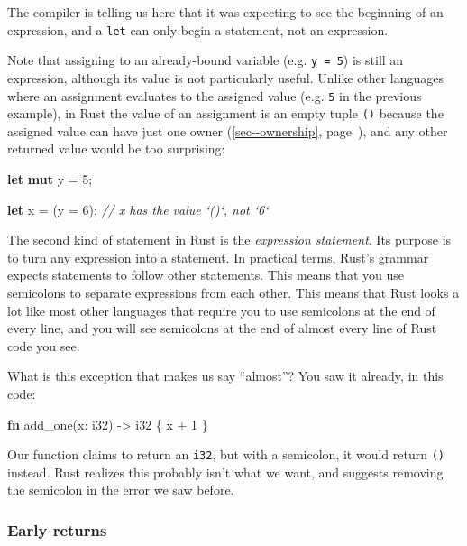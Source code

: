 \documentclass[a4paper,]{book}
\renewcommand*{\hyperref}[2][\ar]{%
  \def\ar{#2}%
  #2 (\autoref{#1}, page~\pageref{#1})}
\newenvironment{Shaded}{\begin{snugshade}}{\end{snugshade}}
\newcommand{\KeywordTok}[1]{\textcolor[rgb]{0.13,0.29,0.53}{\textbf{{#1}}}}
\newcommand{\DataTypeTok}[1]{\textcolor[rgb]{0.13,0.29,0.53}{{#1}}}
\newcommand{\DecValTok}[1]{\textcolor[rgb]{0.00,0.00,0.81}{{#1}}}
\newcommand{\CommentTok}[1]{\textcolor[rgb]{0.56,0.35,0.01}{\textit{{#1}}}}
\newcommand{\NormalTok}[1]{{#1}}
\begin{document}
The compiler is telling us here that it was expecting to see the
beginning of an expression, and a \texttt{let} can only begin a
statement, not an expression.

Note that assigning to an already-bound variable (e.g. \texttt{y\ =\ 5})
is still an expression, although its value is not particularly useful.
Unlike other languages where an assignment evaluates to the assigned
value (e.g. \texttt{5} in the previous example), in Rust the value of an
assignment is an empty tuple \texttt{()} because the assigned value can
have \hyperref[sec--ownership]{just one owner}, and any other returned
value would be too surprising:

\begin{Shaded}
\begin{Highlighting}[]
\KeywordTok{let} \KeywordTok{mut} \NormalTok{y = }\DecValTok{5}\NormalTok{;}

\KeywordTok{let} \NormalTok{x = (y = }\DecValTok{6}\NormalTok{);  }\CommentTok{// x has the value `()`, not `6`}
\end{Highlighting}
\end{Shaded}

The second kind of statement in Rust is the \emph{expression statement}.
Its purpose is to turn any expression into a statement. In practical
terms, Rust's grammar expects statements to follow other statements.
This means that you use semicolons to separate expressions from each
other. This means that Rust looks a lot like most other languages that
require you to use semicolons at the end of every line, and you will see
semicolons at the end of almost every line of Rust code you see.

What is this exception that makes us say ``almost''? You saw it already,
in this code:

\begin{Shaded}
\begin{Highlighting}[]
\KeywordTok{fn} \NormalTok{add_one(x: }\DataTypeTok{i32}\NormalTok{) -> }\DataTypeTok{i32} \NormalTok{\{}
    \NormalTok{x + }\DecValTok{1}
\NormalTok{\}}
\end{Highlighting}
\end{Shaded}

Our function claims to return an \texttt{i32}, but with a semicolon, it
would return \texttt{()} instead. Rust realizes this probably isn't what
we want, and suggests removing the semicolon in the error we saw before.

\subsubsection{Early returns}\label{early-returns}
\end{document}
